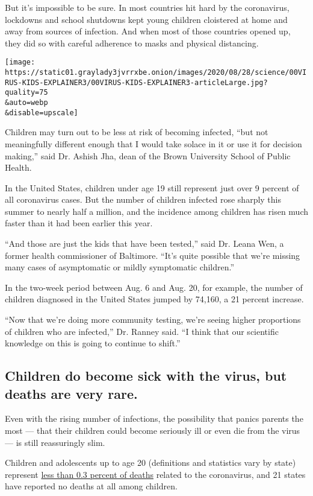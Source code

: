 But it's impossible to be sure. In most countries hit hard by the
coronavirus, lockdowns and school shutdowns kept young children
cloistered at home and away from sources of infection. And when most of
those countries opened up, they did so with careful adherence to masks
and physical distancing.

\texttt{[image: https://static01.graylady3jvrrxbe.onion/images/2020/08/28/science/00VIRUS-KIDS-EXPLAINER3/00VIRUS-KIDS-EXPLAINER3-articleLarge.jpg?quality=75\\\&auto=webp\\\&disable=upscale]}

Children may turn out to be less at risk of becoming infected, ``but not
meaningfully different enough that I would take solace in it or use it
for decision making,'' said Dr. Ashish Jha, dean of the Brown University
School of Public Health.

In the United States, children under age 19 still represent just over 9
percent of all coronavirus cases. But the number of children infected
rose sharply this summer to nearly half a million, and the incidence
among children has risen much faster than it had been earlier this year.

``And those are just the kids that have been tested,'' said Dr. Leana
Wen, a former health commissioner of Baltimore. ``It's quite possible
that we're missing many cases of asymptomatic or mildly symptomatic
children.''

In the two-week period between Aug. 6 and Aug. 20, for example, the
number of children diagnosed in the United States jumped by 74,160, a 21
percent increase.

``Now that we're doing more community testing, we're seeing higher
proportions of children who are infected,'' Dr. Ranney said. ``I think
that our scientific knowledge on this is going to continue to shift.''

\hypertarget{children-do-become-sick-with-the-virus-but-deaths-are-very-rare}{%
\subsection{Children do become sick with the virus, but deaths are very
rare.}\label{children-do-become-sick-with-the-virus-but-deaths-are-very-rare}}

Even with the rising number of infections, the possibility that panics
parents the most --- that their children could become seriously ill or
even die from the virus --- is still reassuringly slim.

Children and adolescents up to age 20 (definitions and statistics vary
by state) represent
\href{https://services.aap.org/en/pages/2019-novel-coronavirus-covid-19-infections/children-and-covid-19-state-level-data-report/}{less
than 0.3 percent of deaths} related to the coronavirus, and 21 states
have reported no deaths at all among children.

